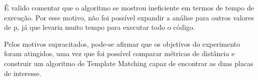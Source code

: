 \documentclass[12pt]{article}
\begin{document}
    \par É valido comentar que o algoritmo se mostrou ineficiente em termos de tempo de execução. Por esse motivo, não foi possível expandir a análise para outros valores de p, já que levaria muito tempo para executar todo o código.

    \par Pelos motivos supracitados, pode-se afirmar que os objetivos do experimento foram atingidos, uma vez que foi possível comparar métricas de distância e construir um algoritmo de Template Matching capaz de encontrar as duas placas de interesse.

\end{document}

